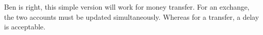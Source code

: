 \documentclass[a4paper,12pt]{article}
\begin{document}
Ben is right, this simple version will work for money transfer.  For
an exchange,  the two accounts must be updated simultaneously.
Whereas for a transfer, a delay is acceptable.
\end{document}
